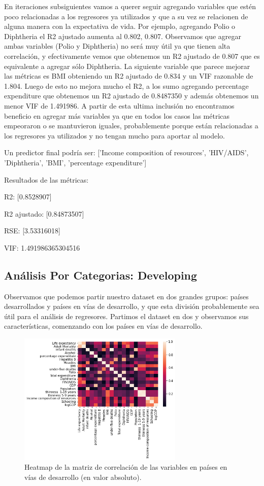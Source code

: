 En iteraciones subsiguientes vamos a querer seguir agregando variables que estén poco relacionadas a los regresores ya utilizados y que a su vez se relacionen de alguna manera con la expectativa de vida. Por ejemplo, agregando Polio o Diphtheria el R2 ajustado aumenta al 0.802, 0.807. Observamos que agregar ambas variables (Polio y Diphtheria) no será muy útil ya que tienen alta correlación, y efectivamente vemos que obtenemos un R2 ajustado de 0.807 que es equivalente a agregar sólo Diphtheria. La siguiente variable que parece mejorar las métricas es BMI obteniendo un R2 ajustado de 0.834 y un VIF razonable de 1.804. Luego de esto no mejora mucho el R2, a los sumo agregando percentage expenditure que obtenemos un R2 ajustado de 0.8487350 y además obtenemos un menor VIF de 1.491986.
A partir de esta ultima inclusión no encontramos beneficio en agregar más variables ya que en todos los casos las métricas empeoraron o se mantuvieron iguales, probablemente porque están relacionadas a los regresores ya utilizados y no tengan mucho para aportar al modelo.

Un predictor final podría ser:
['Income composition of resources', 'HIV/AIDS', 'Diphtheria', 'BMI', 'percentage expenditure']


Resultados de las métricas:

R2: [0.8528907]

R2 ajustado: [0.84873507]

RSE: [3.53316018]

VIF: 1.491986365304516

\subsection{Análisis Por Categorias: Developing}

Observamos que podemos partir nuestro dataset en dos grandes grupos: países desarrollados y países en vías de desarrollo, y que esta división probablemente sea útil para el análisis de regresores. Partimos el dataset en dos y observamos sus características, comenzando con los países en vías de desarrollo.

 \begin{figure}[H]
	\centering
	\includegraphics[width=0.7\textwidth]{img/heatmap_corr_developing.png}
	\caption{Heatmap de la matriz de correlación de las variables en países en vías de desarrollo (en valor absoluto).}
	\label{heatmap_developing}
\end{figure}

